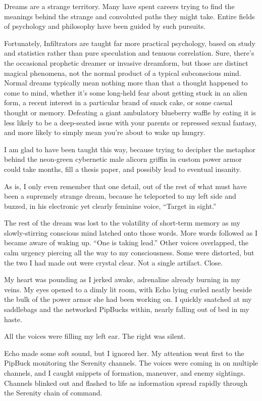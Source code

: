 Dreams are a strange territory. Many have spent careers trying to find the meanings behind the strange and convoluted paths they might take. Entire fields of psychology and philosophy have been guided by such pursuits.

Fortunately, Infiltrators are taught far more practical psychology, based on study and statistics rather than pure speculation and tenuous correlation. Sure, there’s the occasional prophetic dreamer or invasive dreamform, but those are distinct magical phenomena, not the normal product of a typical subconscious mind. Normal dreams typically mean nothing more than that a thought happened to come to mind, whether it’s some long-held fear about getting stuck in an alien form, a recent interest in a particular brand of snack cake, or some casual thought or memory. Defeating a giant ambulatory blueberry waffle by eating it is less likely to be a deep-seated issue with your parents or repressed sexual fantasy, and more likely to simply mean you’re about to wake up hungry.

I am glad to have been taught this way, because trying to decipher the metaphor behind the neon-green cybernetic male alicorn griffin in custom power armor could take months, fill a thesis paper, and possibly lead to eventual insanity.

As is, I only even remember that one detail, out of the rest of what must have been a supremely strange dream, because he teleported to my left side and buzzed, in his electronic yet clearly feminine voice, “Target in sight.”

The rest of the dream was lost to the volatility of short-term memory as my slowly-stirring conscious mind latched onto those words. More words followed as I became aware of waking up. “One is taking lead.” Other voices overlapped, the calm urgency piercing all the way to my consciousness. Some were distorted, but the two I had made out were crystal clear. Not a single artifact. Close.

My heart was pounding as I jerked awake, adrenaline already burning in my veins. My eyes opened to a dimly lit room, with Echo lying curled neatly beside the bulk of the power armor she had been working on. I quickly snatched at my saddlebags and the networked PipBucks within, nearly falling out of bed in my haste.

All the voices were filling my left ear. The right was silent.

Echo made some soft sound, but I ignored her. My attention went first to the PipBuck monitoring the Serenity channels. The voices were coming in on multiple channels, and I caught snippets of formation, maneuver, and enemy sightings. Channels blinked out and flashed to life as information spread rapidly through the Serenity chain of command.

